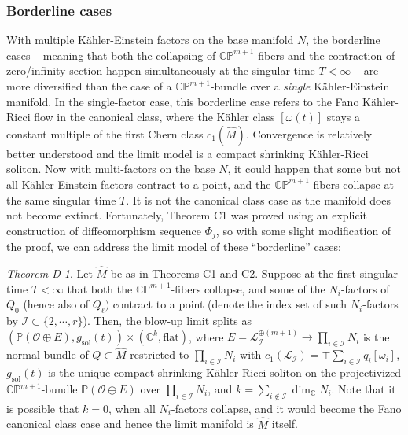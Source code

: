 \documentclass[11pt]{amsart}
\theoremstyle{plain}
\numberwithin{equation}{section}
\theoremstyle{definition}
\theoremstyle{remark}
\newtheorem*{thmD}{Theorem D}
\begin{document}
\subsubsection{Borderline cases}
With multiple K\"ahler-Einstein factors on the base manifold $N$, the borderline cases -- meaning that both the collapsing of $\mathbb{CP}^{m+1}$-fibers and the contraction of zero/infinity-section happen simultaneously at the singular time $T < \infty$ -- are more diversified than the case of a $\mathbb{CP}^{m+1}$-bundle over a \emph{single} K\"ahler-Einstein manifold. In the single-factor case, this borderline case refers to the Fano K\"ahler-Ricci flow in the canonical class, where the K\"ahler class $[\omega(t)]$ stays a constant multiple of the first Chern class $c_1(\widehat{M})$. Convergence is relatively better understood and the limit model is a compact shrinking K\"ahler-Ricci soliton. Now with multi-factors on the base $N$, it could happen that some but not all K\"ahler-Einstein factors contract to a point, and the $\mathbb{CP}^{m+1}$-fibers collapse at the same singular time $T$. It is not the canonical class case as the manifold does not become extinct. Fortunately, Theorem C1 was proved using an explicit construction of diffeomorphism sequence $\Phi_j$, so with some slight modification of the proof, we can address the limit model of these ``borderline'' cases:

\begin{thmD}
Let $\widehat{M}$ be as in Theorems C1 and C2. Suppose at the first singular time $T < \infty$ that both the $\mathbb{CP}^{m+1}$-fibers collapse, and some of the $N_i$-factors of $Q_0$ (hence also of $Q_\ell)$ contract to a point (denote the index set of such $N_i$-factors by $\mathcal{I} \subset \{2, \cdots, r\}$). Then, the blow-up limit splits as $( \mathbb{P}(\mathcal{O} \oplus E), g_{\mathrm{sol}} ( t ) ) \times (\mathbb{C}^k, \textrm{flat})$, where $E = \mathcal{L}_{\mathcal{I}}^{\oplus (m+1)} \to \prod_{i \in \mathcal{I}} N_i$ is the normal bundle of $Q \subset \widehat{M}$ restricted to $\prod_{i \in \mathcal{I}} N_i$ with $c_1(\mathcal{L}_{\mathcal{I}}) = \mp\sum_{i\in\mathcal{I}}q_i[\omega_i]$, $g_{\mathrm{sol}}(t)$ is the unique compact shrinking K\"ahler-Ricci soliton on the projectivized $\mathbb{CP}^{m+1}$-bundle $\mathbb{P}(\mathcal{O} \oplus E)$ over $\prod_{i \in \mathcal{I}} N_i$, and $k = \sum_{i \not\in \mathcal{I}} \dim_{\mathbb{C}} N_{i}$. Note that it is possible that $k = 0$, when all $N_i$-factors collapse, and it would become the Fano canonical class case and hence the limit manifold is $\widehat{M}$ itself.
\end{thmD}
\end{document}
